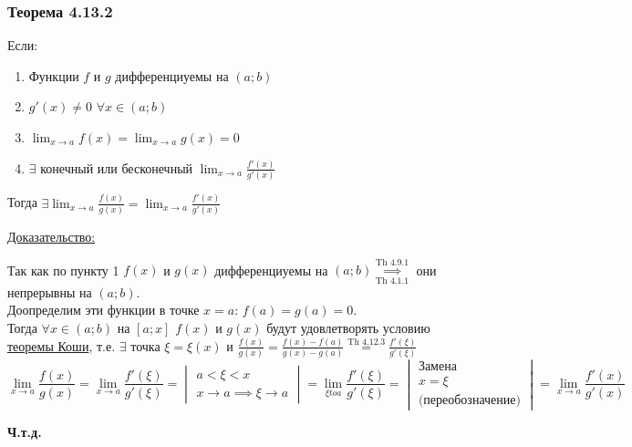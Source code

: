 \documentclass[12pt]{article}
\begin{document}
    \subsubsection*{Теорема 4.13.2}\label{th:4.13.2}
    \noindent Если: \begin{enumerate}
        \item Функции $f$ и $g$ дифференциуемы на $(a;b)$
        \item $g'(x) \ne 0$ $\forall x \in (a;b)$
        \item $\lim_{x\to a} f(x) = \lim_{x\to a}g(x) = 0$
        \item $\exists$ конечный или бесконечный $\lim_{x\to a} \frac{f'(x)}{g'(x)}$
    \end{enumerate}
    Тогда $\exists \lim_{x\to a}\frac{f(x)}{g(x)} = \lim_{x\to a}\frac{f'(x)}{g'(x)}$\par\noindent
    \underline{Доказательство:}
    \begin{adjustwidth}{1.5em}{1.5em}
        Так как по пункту 1 $f(x)$ и $g(x)$ дифференциуемы на $(a;b) \underset{\hyperref[th:4.1.1]{\text{Th 4.1.1}}}{\overset{\hyperref[th:4.9.1]{\text{Th 4.9.1}}}{\implies}}$ они непрерывны на $(a; b)$.\\
        Доопределим эти функции в точке $x = a$: $f(a) = g(a) = 0$.\\
        Тогда $\forall x \in (a; b)$ на $[a; x]$ $f(x)$ и $g(x)$ будут удовлетворять условию \hyperref[th:4.12.3]{теоремы Коши}, т.е. $\exists$ точка $\xi = \xi(x)$ и $\frac{f(x)}{g(x)} = \frac{f(x) - f(a)}{g(x) - g(a)} \overset{\hyperref[th:4.12.3]{\text{Th 4.12.3}}}{=} \frac{f'(\xi)}{g'(\xi)}$
        \[ \boxed{\lim_{x \to a}\frac{f(x)}{g(x)}} = \lim_{x\to a}\frac{f'(\xi)}{g'(\xi)} = \begin{vmatrix}
            a < \xi < x\\
            x \to a \implies \xi \to a
        \end{vmatrix} = \lim_{\xi to a} \frac{f'(\xi)}{g'(\xi)} = \begin{vmatrix}
            \text{Замена}\\
            x = \xi\\
            \text{(переобозначение)}
        \end{vmatrix} = \boxed{\lim_{x\to a}\frac{f'(x)}{g'(x)}} \]
        \begin{center}
            \textbf{Ч.т.д.}
        \end{center}
    \end{adjustwidth}
\end{document}
